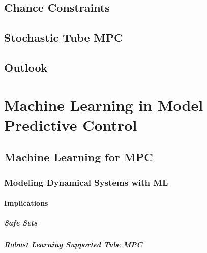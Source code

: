     \section{Chance Constraints} %

    \section{Stochastic Tube MPC} %

    \section{Outlook} %

\chapter{Machine Learning in Model Predictive Control} %

    \section{Machine Learning for MPC} %

        \subsection{Modeling Dynamical Systems with ML} %

            \subsubsection{Implications} %

                \paragraph{Safe Sets} %

                \paragraph{Robust Learning Supported Tube MPC} %

